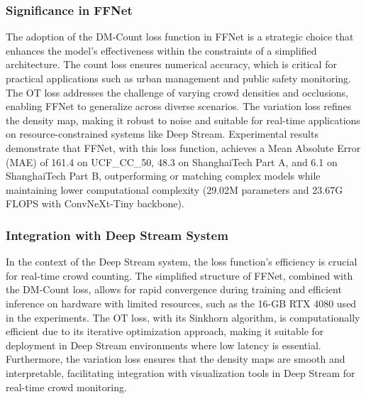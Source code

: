 \subsubsection{Significance in FFNet}
The adoption of the DM-Count loss function in FFNet is a strategic choice that enhances the model's effectiveness within the constraints of a simplified architecture. The count loss ensures numerical accuracy, which is critical for practical applications such as urban management and public safety monitoring. The OT loss addresses the challenge of varying crowd densities and occlusions, enabling FFNet to generalize across diverse scenarios. The variation loss refines the density map, making it robust to noise and suitable for real-time applications on resource-constrained systems like Deep Stream. Experimental results demonstrate that FFNet, with this loss function, achieves a Mean Absolute Error (MAE) of 161.4 on UCF\_CC\_50, 48.3 on ShanghaiTech Part A, and 6.1 on ShanghaiTech Part B, outperforming or matching complex models while maintaining lower computational complexity (29.02M parameters and 23.67G FLOPS with ConvNeXt-Tiny backbone).

\subsubsection{Integration with Deep Stream System}
In the context of the Deep Stream system, the loss function's efficiency is crucial for real-time crowd counting. The simplified structure of FFNet, combined with the DM-Count loss, allows for rapid convergence during training and efficient inference on hardware with limited resources, such as the 16-GB RTX 4080 used in the experiments. The OT loss, with its Sinkhorn algorithm, is computationally efficient due to its iterative optimization approach, making it suitable for deployment in Deep Stream environments where low latency is essential. Furthermore, the variation loss ensures that the density maps are smooth and interpretable, facilitating integration with visualization tools in Deep Stream for real-time crowd monitoring.